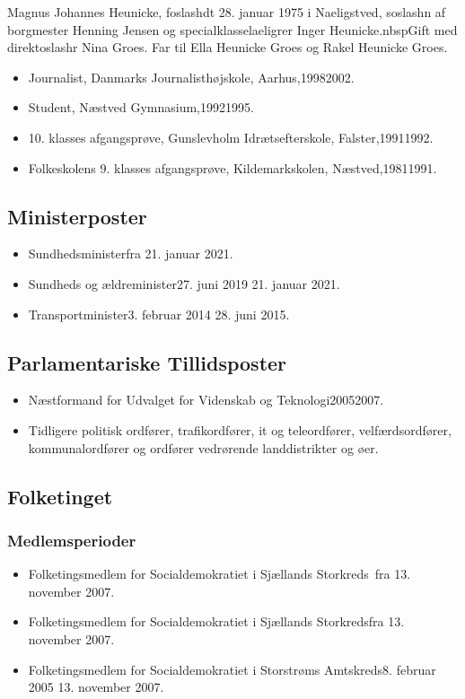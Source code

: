 \documentclass[11pt, a4paper]{awesome-cv}
\begin{document}
\makecvheader[R]
\makelettertitle
\begin{cvletter}
Magnus Johannes Heunicke, foslashdt 28. januar 1975 i Naeligstved, soslashn af borgmester Henning Jensen og specialklasselaeligrer Inger Heunicke.nbspGift med direktoslashr Nina Groes. Far til Ella Heunicke Groes og Rakel Heunicke Groes.

\begin{itemize}
\item Journalist, Danmarks Journalisthøjskole, Aarhus,19982002.
\item Student, Næstved Gymnasium,19921995.
\item 10. klasses afgangsprøve, Gunslevholm Idrætsefterskole, Falster,19911992.
\item Folkeskolens 9. klasses afgangsprøve, Kildemarkskolen, Næstved,19811991.
\end{itemize}
\subsection*{Ministerposter}
\begin{itemize}
\item Sundhedsministerfra 21. januar 2021.
\item Sundheds og ældreminister27. juni 2019  21. januar 2021.
\item Transportminister3. februar 2014  28. juni 2015.
\end{itemize}
\subsection*{Parlamentariske Tillidsposter}
\begin{itemize}
\item Næstformand for Udvalget for Videnskab og Teknologi20052007.
\item Tidligere politisk ordfører, trafikordfører, it og teleordfører, velfærdsordfører, kommunalordfører og ordfører vedrørende landdistrikter og øer.
\end{itemize}
\subsection*{Folketinget}
\subsubsection*{Medlemsperioder}
\begin{itemize}
\item Folketingsmedlem for Socialdemokratiet i Sjællands Storkreds fra 13. november 2007.
\item Folketingsmedlem for Socialdemokratiet i Sjællands Storkredsfra 13. november 2007.
\item Folketingsmedlem for Socialdemokratiet i Storstrøms Amtskreds8. februar 2005  13. november 2007.
\end{itemize}

\end{cvletter}
\end{document}
